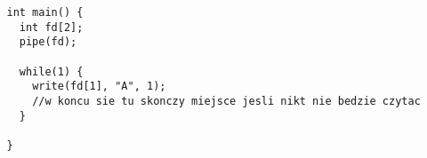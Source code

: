 \begin{verbatim}
   int main() {
     int fd[2];
     pipe(fd);
     
     while(1) { 
       write(fd[1], "A", 1);
       //w koncu sie tu skonczy miejsce jesli nikt nie bedzie czytac
     }
   
   }
\end{verbatim}
